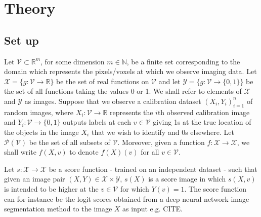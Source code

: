 \section{Theory}
\subsection{Set up}
Let $\mathcal{V} \subset \mathbb{R}^m$, for some dimension $m \in \mathbb{N}$, be a finite set corresponding to the domain which represents the pixels/voxels at which we observe imaging data. Let $\mathcal{X} = \lbrace g: \mathcal{V} \rightarrow \mathbb{R}\rbrace$ be the set of real functions on $\mathcal{V}$ and let $\mathcal{Y} = \lbrace g: \mathcal{V} \rightarrow \lbrace 0,1 \rbrace \rbrace$ be the set of all functions taking the values 0 or 1. We shall refer to elements of $\mathcal{X}$ and $\mathcal{Y}$ as images. Suppose that we observe a calibration dataset $(X_i, Y_i)_{i = 1}^n$ of random images, where $X_i: \mathcal{V} \rightarrow \mathbb{R}$ represents the $i$th observed calibration image and $Y_i:\mathcal{V} \rightarrow \lbrace 0, 1\rbrace$ outputs labels at each $v \in \mathcal{V}$ giving 1s at the true location of the objects in the image $X_i$ that we wish to identify and 0s elsewhere. Let $\mathcal{P}(\mathcal{V})$ be the set of all subsets of $\mathcal{V}$. Moreover, given a function $f:\mathcal{X} \rightarrow \mathcal{X}$, we shall write $f(X,v)$ to denote $f(X)(v)$ for all $v \in \mathcal{V}$.

Let $s:\mathcal{X}  \rightarrow \mathcal{X} $ be a score function - trained on an independent dataset - such that given an image pair $(X,Y) \in \mathcal{X}\times \mathcal{Y}$, $s(X)$ is a score image in which $s(X,v) $ is intended to be higher at the $v \in \mathcal{V}$ for which $Y(v) = 1$. The score function can for instance be the logit scores obtained from a deep neural network image segmentation method to the image $X$ as input e.g. CITE. 

